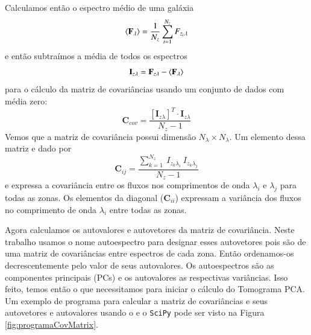 Calculamos então o espectro médio de uma galáxia
\begin{equation}
\mean{\mathbf{F}{}_\lambda} = \frac{1}{N_z} \sum_{i=1}^{N_z} F_{z_i}{}_{\lambda}
\end{equation}
\noindent e então subtraímos a média de todos os espectros
\begin{equation}
	\label{eq:PCA:Izl}
	\mathbf{I}{}_{z \lambda} = \mathbf{F}{}_{z \lambda} - \mean{\mathbf{F}{}_\lambda}
\end{equation}
\noindent para o cálculo da matriz de covariâncias usando um conjunto de dados com média zero:
\begin{equation}
	\label{eq:PCA:covMatrix}
	\mathbf{C}{}_{cov} = \frac{[\mathbf{I}{}_{z \lambda}]^T \cdot \mathbf{I}{}_{z \lambda}}{N_z - 1}
\end{equation}
\noindent Vemos que a matriz de covariância possui dimensão $N_\lambda \times N_\lambda$. Um elemento dessa matriz e
dado por
\begin{equation}
	\label{eq:PCA:covMatrix}
	\mathbf{C}{}_{i j} = \frac{\sum_{k=1}^{N_z}\ I_{z_k \lambda_i}\ I_{z_k \lambda_j}}{N_z - 1}
\end{equation}
\noindent e expressa a covariância entre os fluxos nos comprimentos de onda $\lambda_i$ e $\lambda_j$ para todas as
zonas. Os elementos da diagonal ($\mathbf{C}{}_{i i}$) expressam a variância dos fluxos no comprimento de onda
$\lambda_i$ entre todas as zonas.

Agora calculamos os autovalores e autovetores da matriz de covariância. Neste trabalho usamos o nome autoespectro para
designar esses autovetores pois são de uma matriz de covariâncias entre espectros de cada zona. Então ordenamos-os
decrescentemente pelo valor de seus autovalores. Os autoespectros são as componentes principais (PCs) e os autovalores
as respectivas variâncias. Isso feito, temos então o que necessitamos para iniciar o cálculo do Tomograma PCA. Um
exemplo de programa para calcular a matriz de covariâncias e seus autovetores e autovalores usando o \pycasso e o
\texttt{SciPy} pode ser visto na Figura \ref{fig:programaCovMatrix}.

